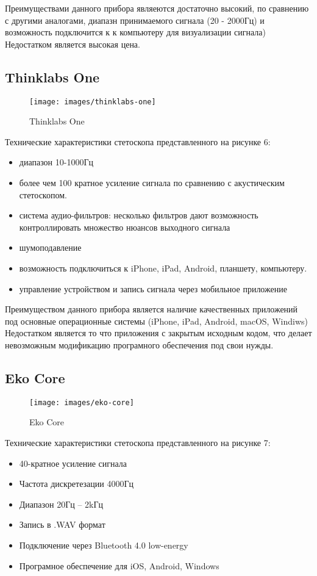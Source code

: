 \documentclass[../main.tex]{subfiles}
\begin{document}
Преимуществами данного прибора являеются достаточно высокий, по сравнению с другими аналогами, диапазн принимаемого сигнала (20 - 2000Гц) и возможность подключится к к компьютеру для визуализации сигнала) Недостатком является высокая цена.

\subsection{Thinklabs One}
\begin{figure}[H]
\centering
\texttt{[image: images/thinklabs-one]}
\caption{Thinklabs One}
\end{figure}

Технические характеристики \cite{thinklabs-one} стетоскопа представленного на рисунке 6:
\begin{itemize}
  \item диапазон 10-1000Гц
  \item более чем 100 кратное усиление сигнала по сравнению с акустическим стетоскопом.
  \item система аудио-фильтров: несколько фильтров дают возможность контроллировать множество нюансов выходного сигнала
  \item шумоподавление
  \item возможность подключиться к iPhone, iPad, Android, планшету, компьютеру.
  \item управление устройством и запись сигнала через мобильное приложение
\end{itemize}

Преимуществом данного прибора является наличие качественных приложений под основные операционные системы (iPhone, iPad, Android, macOS, Windiws) Недостатком является то что приложения с закрытым исходным кодом, что делает невозможным модификацию програмного обеспечения под свои нужды.

\subsection{Eko Core}
\begin{figure}[H]
\centering
\texttt{[image: images/eko-core]}
\caption{Eko Core}
\end{figure}

Технические характеристики \cite{eko-core} стетоскопа представленного на рисунке 7:
\begin{itemize}
  \item 40-кратное усиление сигнала
  \item Частота дискретезации 4000Гц
  \item Диапазон 20Гц – 2kГц
  \item Запись в .WAV формат
  \item Подключение через Bluetooth 4.0 low-energy
  \item Програмное обеспечение для iOS, Android, Windows
\end{itemize}
\end{document}
